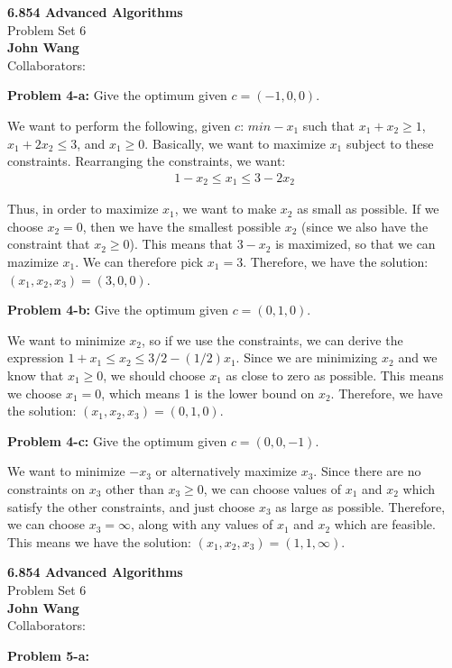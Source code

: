 \documentclass[psamsfonts]{amsart}
\newenvironment{sol}{\vspace{0.25cm}{\large \bfseries Solution:}}{\qedsymbol}
\newenvironment{prob}[1]{\begin{framed}{\large \bfseries Problem #1:}}{\end{framed}}
\newcommand{\makenewtitle}{
    \begin{center}
    {\huge \bfseries 6.854 Advanced Algorithms} \\
    Problem Set 6\\
    \vspace{0.25cm}
    {\bfseries John Wang} \\
    Collaborators: 
    \end{center}
    \vspace{0.5cm}
}
\begin{document}
\newpage
\makenewtitle

\begin{prob}{4-a}
Give the optimum given $c = (-1, 0, 0)$. 
\end{prob}

\begin{sol}
We want to perform the following, given $c$: $min -x_1$ such that $x_1 + x_2 \geq 1$, $x_1 + 2 x_2 \leq 3$, and $x_1 \geq 0$. Basically, we want to maximize $x_1$ subject to these constraints. Rearranging the constraints, we want:
\begin{eqnarray}
1 - x_2 \leq x_1 \leq 3 - 2 x_2
\end{eqnarray}

Thus, in order to maximize $x_1$, we want to make $x_2$ as small as possible. If we choose $x_2 = 0$, then we have the smallest possible $x_2$ (since we also have the constraint that $x_2 \geq 0$). This means that $3 - x_2$ is maximized, so that we can mazimize $x_1$. We can therefore pick $x_1 = 3$. Therefore, we have the solution: $(x_1, x_2, x_3) = (3, 0, 0)$. 
\end{sol}

\begin{prob}{4-b}
Give the optimum given $c = (0, 1, 0)$. 
\end{prob}

\begin{sol}
We want to minimize $x_2$, so if we use the constraints, we can derive the expression $1 + x_1 \leq x_2 \leq 3/2 - (1/2) x_1$. Since we are minimizing $x_2$ and we know that $x_1 \geq 0$, we should choose $x_1$ as close to zero as possible. This means we choose $x_1 = 0$, which means 1 is the lower bound on $x_2$. Therefore, we have the solution: $(x_1, x_2, x_3) = (0, 1, 0)$. 
\end{sol}

\begin{prob}{4-c}
Give the optimum given $c = (0, 0, -1)$.
\end{prob}

\begin{sol}
We want to minimize $-x_3$ or alternatively maximize $x_3$. Since there are no constraints on $x_3$ other than $x_3 \geq 0$, we can choose values of $x_1$ and $x_2$ which satisfy the other constraints, and just choose $x_3$ as large as possible. Therefore, we can choose $x_3 = \infty$, along with any values of $x_1$ and $x_2$ which are feasible. This means we have the solution: $(x_1, x_2, x_3) = (1, 1, \infty)$. 
\end{sol}

\newpage
\makenewtitle

\begin{prob}{5-a}

\end{prob}
\end{document}
